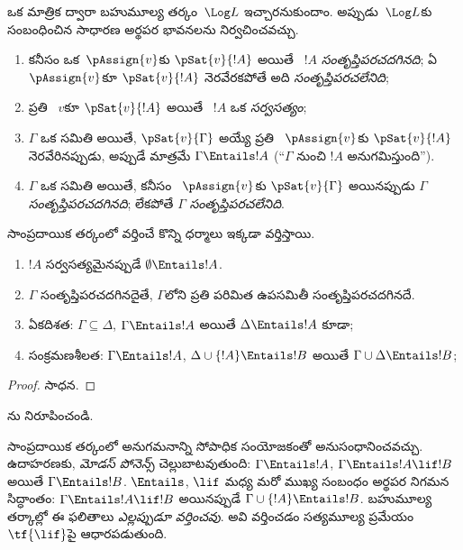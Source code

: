 \documentclass[../../../include/open-logic-section]{subfiles}
\begin{document}


ఒక మాత్రిక ద్వారా బహుమూల్య తర్కం~$\Log L$ ఇచ్చారనుకుందాం.
అప్పుడు~$\Log L$కు సంబంధించిన సాధారణ అర్థపర భావనలను నిర్వచించవచ్చు.

\begin{defn}
\begin{enumerate}
\item కనీసం ఒక~$\pAssign{v}$కు $\pSat{v}{!A}$ అయితే
  ~$!A$ \emph{సంతృప్తిపరచదగినది};
  ఏ $\pAssign{v}$కూ $\pSat{v}{!A}$ నెరవేరకపోతే అది
  \emph{సంతృప్తిపరచలేనిది};
\item ప్రతి ~$v$కూ
  $\pSat{v}{!A}$ అయితే ~$!A$
  ఒక \emph{సర్వసత్యం};
\item $\Gamma$ ఒక  సమితి అయితే,
  $\pSat{v}{\Gamma}$ అయ్యే ప్రతి
  ~$\pAssign{v}$కు
  $\pSat{v}{!A}$ నెరవేరినప్పుడు, అప్పుడే మాత్రమే
  $\Gamma \Entails !A$ (``$\Gamma$ నుంచి $!A$ అనుగమిస్తుంది'').
\item $\Gamma$ ఒక  సమితి అయితే,
  కనీసం ~$\pAssign{v}$కు
  $\pSat{v}{\Gamma}$ అయినప్పుడు $\Gamma$
  \emph{సంతృప్తిపరచదగినది}; లేకపోతే $\Gamma$
  \emph{సంతృప్తిపరచలేనిది}.
\end{enumerate}
\end{defn}

సాంప్రదాయిక తర్కంలో వర్తించే కొన్ని ధర్మాలు ఇక్కడా వర్తిస్తాయి.

\begin{prop}
\begin{enumerate}
\item $!A$ సర్వసత్యమైనప్పుడే $\emptyset \Entails !A$.
\item $\Gamma$ సంతృప్తిపరచదగినదైతే, $\Gamma$లోని
  ప్రతి పరిమిత ఉపసమితీ సంతృప్తిపరచదగినదే.
\item{}%
ఏకదిశత: $\Gamma \subseteq \Delta$,
  $\Gamma \Entails !A$ అయితే $\Delta \Entails !A$ కూడా;
\item{}%
సంక్రమణశీలత: $\Gamma \Entails !A$,
  $\Delta \cup \{ !A\} \Entails !B$ అయితే
  $\Gamma \cup \Delta \Entails !B$;
\end{enumerate}
\end{prop}

\begin{proof}
సాధన.
\end{proof}

\begin{prob}
ను నిరూపించండి.
\end{prob}

సాంప్రదాయిక తర్కంలో అనుగమనాన్ని సోపాధిక సంయోజకంతో
అనుసంధానించవచ్చు. ఉదాహరణకు, \emph{మోడస్ పోనెన్స్}
చెల్లుబాటవుతుంది: $\Gamma
\Entails !A$, $\Gamma \Entails !A \lif !B$ అయితే
$\Gamma \Entails !B$. $\Entails$, $\lif$ మధ్య మరో ముఖ్య
సంబంధం అర్థపర నిగమన సిద్ధాంతం: $\Gamma \Entails !A
\lif !B$ అయినప్పుడే $\Gamma \cup \{!A\} \Entails !B$.
బహుమూల్య తర్కాల్లో ఈ ఫలితాలు \emph{ఎల్లప్పుడూ వర్తించవు}.
అవి వర్తించడం సత్యమూల్య ప్రమేయం~$\tf{\lif}$పై ఆధారపడుతుంది.
\end{document}
